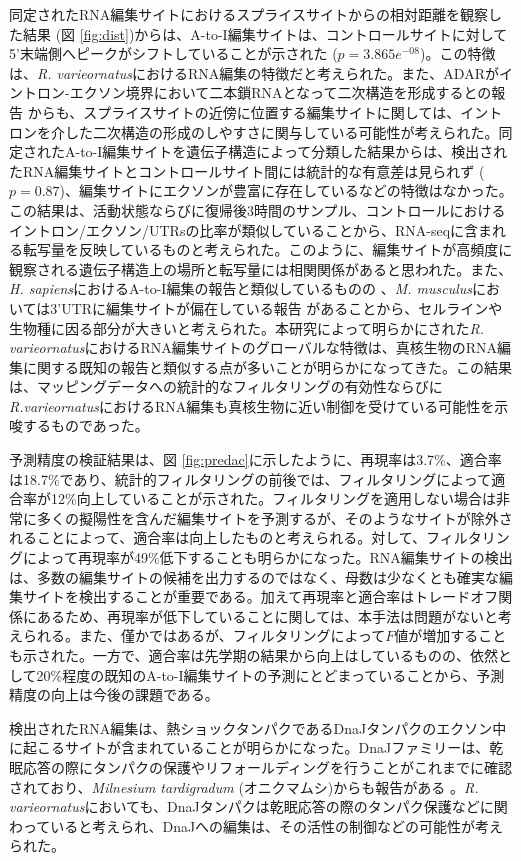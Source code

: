 同定されたRNA編集サイトにおけるスプライスサイトからの相対距離を観察した結果 (図 \ref{fig:dist})からは、A-to-I編集サイトは、コントロールサイトに対して5'末端側へピークがシフトしていることが示された ($p=3.865e^{-08}$)。この特徴は、{\it R. varieornatus}におけるRNA編集の特徴だと考えられた。また、ADARがイントロン-エクソン境界において二本鎖RNAとなって二次構造を形成するとの報告 \citep{pmid15920480}からも、スプライスサイトの近傍に位置する編集サイトに関しては、イントロンを介した二次構造の形成のしやすさに関与している可能性が考えられた。同定されたA-to-I編集サイトを遺伝子構造によって分類した結果からは、検出されたRNA編集サイトとコントロールサイト間には統計的な有意差は見られず ($p=0.87$)、編集サイトにエクソンが豊富に存在しているなどの特徴はなかった。この結果は、活動状態ならびに復帰後3時間のサンプル、コントロールにおけるイントロン/エクソン/UTRsの比率が類似していることから、RNA-seqに含まれる転写量を反映しているものと考えられた。このように、編集サイトが高頻度に観察される遺伝子構造上の場所と転写量には相関関係があると思われた。また、{\it H. sapiens}におけるA-to-I編集の報告と類似しているものの \citep{Ramaswami:2012aa}、{\it M. musculus}においては3'UTRに編集サイトが偏在している報告 \citep{Gu:2012aa}があることから、セルラインや生物種に因る部分が大きいと考えられた。本研究によって明らかにされた{\it R. varieornatus}におけるRNA編集サイトのグローバルな特徴は、真核生物のRNA編集に関する既知の報告と類似する点が多いことが明らかになってきた。この結果は、マッピングデータへの統計的なフィルタリングの有効性ならびに{\it R.varieornatus}におけるRNA編集も真核生物に近い制御を受けている可能性を示唆するものであった。
\par
予測精度の検証結果は、図 \ref{fig:predac}に示したように、再現率は3.7\%、適合率は18.7\%であり、統計的フィルタリングの前後では、フィルタリングによって適合率が12\%向上していることが示された。フィルタリングを適用しない場合は非常に多くの擬陽性を含んだ編集サイトを予測するが、そのようなサイトが除外されることによって、適合率は向上したものと考えられる。対して、フィルタリングによって再現率が49\%低下することも明らかになった。RNA編集サイトの検出は、多数の編集サイトの候補を出力するのではなく、母数は少なくとも確実な編集サイトを検出することが重要である。加えて再現率と適合率はトレードオフ関係にあるため、再現率が低下していることに関しては、本手法は問題がないと考えられる。また、僅かではあるが、フィルタリングによって$F$値が増加することも示された。一方で、適合率は先学期の結果から向上はしているものの、依然として20\%程度の既知のA-to-I編集サイトの予測にとどまっていることから、予測精度の向上は今後の課題である。
\par
検出されたRNA編集は、熱ショックタンパクであるDnaJタンパクのエクソン中に起こるサイトが含まれていることが明らかになった。DnaJファミリーは、乾眠応答の際にタンパクの保護やリフォールディングを行うことがこれまでに確認されており、{\it Milnesium tardigradum} (オニクマムシ)からも報告がある \citep{milne}。{\it R. varieornatus}においても、DnaJタンパクは乾眠応答の際のタンパク保護などに関わっていると考えられ、DnaJへの編集は、その活性の制御などの可能性が考えられた。

